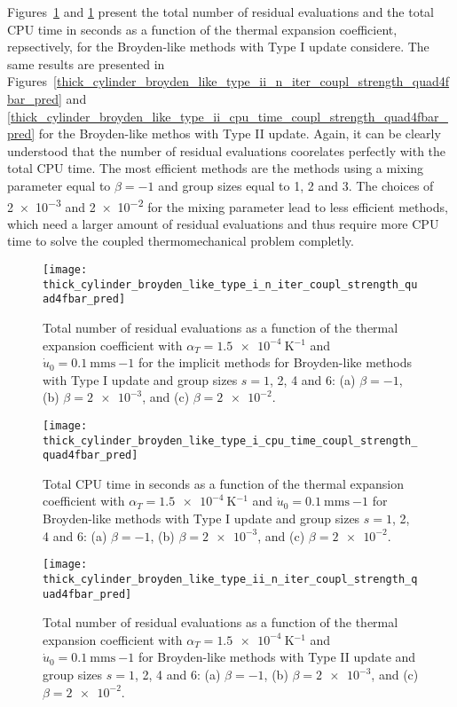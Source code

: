 Figures~\ref{fig:thick_cylinder_broyden_like_type_i_n_iter_coupl_strength_quad4fbar_pred} and \ref{fig:thick_cylinder_broyden_like_type_i_n_iter_coupl_strength_quad4fbar_pred} present the total number of residual evaluations and the total CPU time in seconds as a function of the thermal expansion coefficient, repsectively, for the Broyden-like methods with Type I update considere.
The same results are presented in Figures~\ref{thick_cylinder_broyden_like_type_ii_n_iter_coupl_strength_quad4fbar_pred} and \ref{thick_cylinder_broyden_like_type_ii_cpu_time_coupl_strength_quad4fbar_pred} for the Broyden-like methos with Type II update.
Again, it can be clearly understood that the number of residual evaluations coorelates perfectly with the total CPU time.
The most efficient methods are the methods using a mixing parameter equal to \(\beta=-1\) and group sizes equal to 1, 2 and 3.
The choices of \num{2e-3} and \num{2e-2} for the mixing parameter lead to less efficient methods, which need a larger amount of residual evaluations and thus require more CPU time to solve the coupled thermomechanical problem completly.

\begin{figure}
  \texttt{[image: thick\_cylinder\_broyden\_like\_type\_i\_n\_iter\_coupl\_strength\_quad4fbar\_pred]}
  \caption{Total number of residual evaluations as a function of the thermal expansion coefficient with \(\alpha_T=\SI{1.5e-4}{\kelvin^{-1}}\) and \(\dot u_0 =\SI{0.1}{\milli\meter\second~{-1}}\) for the implicit methods for Broyden-like methods with Type I update and group sizes \(s=1\), 2, 4 and 6: (a) \(\beta=-1\), (b) \(\beta=\num{2e-3}\), and (c) \(\beta=\num{2e-2}\).}
\label{fig:thick_cylinder_broyden_like_type_i_n_iter_coupl_strength_quad4fbar_pred}
\end{figure}

\begin{figure}
  \texttt{[image: thick\_cylinder\_broyden\_like\_type\_i\_cpu\_time\_coupl\_strength\_quad4fbar\_pred]}
  \caption{Total CPU time in seconds as a function of the thermal expansion coefficient with \(\alpha_T=\SI{1.5e-4}{\kelvin^{-1}}\) and \(\dot u_0 =\SI{0.1}{\milli\meter\second~{-1}}\) for Broyden-like methods with Type I update and group sizes \(s=1\), 2, 4 and 6: (a) \(\beta=-1\), (b) \(\beta=\num{2e-3}\), and (c) \(\beta=\num{2e-2}\).}
\label{fig:thick_cylinder_broyden_like_type_i_cpu_time_coupl_strength_quad4fbar_pred}
\end{figure}

\begin{figure}
  \texttt{[image: thick\_cylinder\_broyden\_like\_type\_ii\_n\_iter\_coupl\_strength\_quad4fbar\_pred]}
  \caption{Total number of residual evaluations as a function of the thermal expansion coefficient with \(\alpha_T=\SI{1.5e-4}{\kelvin^{-1}}\) and \(\dot u_0 =\SI{0.1}{\milli\meter\second~{-1}}\) for Broyden-like methods with Type II update and group sizes \(s=1\), 2, 4 and 6: (a) \(\beta=-1\), (b) \(\beta=\num{2e-3}\), and (c) \(\beta=\num{2e-2}\).}
\label{fig:thick_cylinder_broyden_like_type_ii_n_iter_coupl_strength_quad4fbar_pred}
\end{figure}


